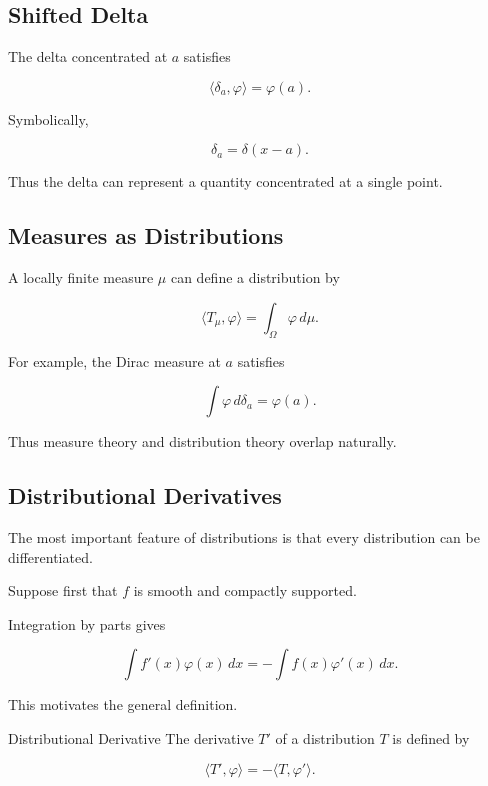 \subsection{Shifted Delta}
\label{subsec:shifted-delta}

The delta concentrated at \(a\) satisfies

\[
\boxed{
\langle\delta_a,\varphi\rangle
=
\varphi(a).
}
\]

Symbolically,

\[
\boxed{
\delta_a
=
\delta(x-a).
}
\]

Thus the delta can represent a quantity concentrated at a single point.

\subsection{Measures as Distributions}
\label{subsec:measures-as-distributions}

A locally finite measure \(\mu\) can define a distribution by

\[
\boxed{
\langle T_\mu,\varphi\rangle
=
\int_\Omega
\varphi\,d\mu.
}
\]

For example, the Dirac measure at \(a\) satisfies

\[
\int\varphi\,d\delta_a
=
\varphi(a).
\]

Thus measure theory and distribution theory overlap naturally.

\subsection{Distributional Derivatives}
\label{subsec:distributional-derivatives}

The most important feature of distributions is that every distribution
can be differentiated.

Suppose first that \(f\) is smooth and compactly supported.

Integration by parts gives

\[
\int
f'(x)\varphi(x)\,dx
=
-
\int
f(x)\varphi'(x)\,dx.
\]

This motivates the general definition.

\begin{definitionbox}{Distributional Derivative}
The derivative \(T'\) of a distribution \(T\) is defined by

\[
\boxed{
\langle T',\varphi\rangle
=
-
\langle T,\varphi'\rangle.
}
\]
\end{definitionbox}

